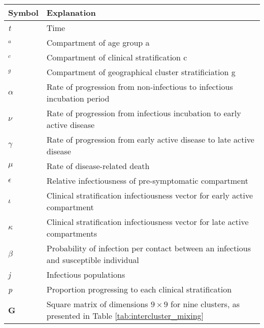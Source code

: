 \begin{table}[ht]
\renewcommand{\baselinestretch}{1}
    	\begin{tabular}{| p{2cm} | p{11.1cm} |}
    	\hline
    		Symbol & Explanation \\
    		\hline
    		\textit{t} & Time  \\
    		$_{\textit{a}}$ & Compartment of age group a \\
    		$_{\textit{c}}$ & Compartment of clinical stratification c \\
    		$_{\textit{g}}$ & Compartment of geographical cluster stratificiation g \\
    		$\alpha$ & Rate of progression from non-infectious to infectious incubation period \\
    		$\nu$ & Rate of progression from infectious incubation to early active disease \\
    		$\gamma$ & Rate of progression from early active disease to late active disease \\
    		$\mu$ & Rate of disease-related death \\
    		$\epsilon$ & Relative infectiousness of pre-symptomatic compartment \\
    		$\iota$ & Clinical stratification infectiousness vector for early active compartment \\
    		$\kappa$ & Clinical stratification infectiousness vector for late active compartments \\
    		$\beta$ & Probability of infection per contact between an infectious and susceptible individual \\
	    	\textit{j} & Infectious populations \\
    		\textit{p} & Proportion progressing to each clinical stratification \\
    		\textbf{G} & Square matrix of dimensions \(9 \times 9\) for nine clusters, as presented in Table \ref{tab:intercluster_mixing} \\
    \hline
	\end{tabular}
\end{table}

